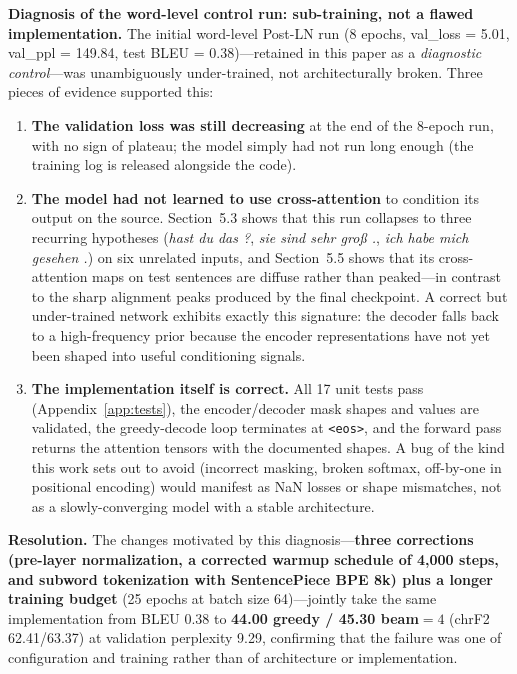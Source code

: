 \documentclass[10pt]{article}
\begin{document}
\textbf{Diagnosis of the word-level control run: sub-training, not a flawed implementation.} The initial word-level Post-LN run (8 epochs, val\_loss = 5.01, val\_ppl = 149.84, test BLEU = 0.38)---retained in this paper as a \textit{diagnostic control}---was unambiguously under-trained, not architecturally broken. Three pieces of evidence supported this:
\begin{enumerate}
\item \textbf{The validation loss was still decreasing} at the end of the 8-epoch run, with no sign of plateau; the model simply had not run long enough (the training log is released alongside the code).
\item \textbf{The model had not learned to use cross-attention} to condition its output on the source. Section~5.3 shows that this run collapses to three recurring hypotheses (\textit{hast du das ?}, \textit{sie sind sehr gro\ss{} .}, \textit{ich habe mich gesehen .}) on six unrelated inputs, and Section~5.5 shows that its cross-attention maps on test sentences are diffuse rather than peaked---in contrast to the sharp alignment peaks produced by the final checkpoint. A correct but under-trained network exhibits exactly this signature: the decoder falls back to a high-frequency prior because the encoder representations have not yet been shaped into useful conditioning signals.
\item \textbf{The implementation itself is correct.} All 17 unit tests pass (Appendix~\ref{app:tests}), the encoder/decoder mask shapes and values are validated, the greedy-decode loop terminates at \texttt{<eos>}, and the forward pass returns the attention tensors with the documented shapes. A bug of the kind this work sets out to avoid (incorrect masking, broken softmax, off-by-one in positional encoding) would manifest as NaN losses or shape mismatches, not as a slowly-converging model with a stable architecture.
\end{enumerate}

\textbf{Resolution.} The changes motivated by this diagnosis---\textbf{three corrections (pre-layer normalization, a corrected warmup schedule of 4{,}000 steps, and subword tokenization with SentencePiece BPE 8k) plus a longer training budget} (25 epochs at batch size 64)---jointly take the same implementation from BLEU 0.38 to \textbf{44.00 greedy / 45.30 beam$=4$} (chrF2 62.41/63.37) at validation perplexity 9.29, confirming that the failure was one of configuration and training rather than of architecture or implementation.
\end{document}
